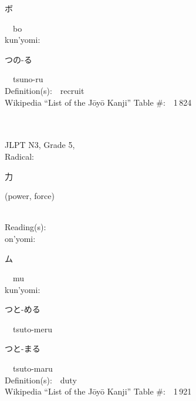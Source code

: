 \begin{multicols}{2}
{\hspace*{2em}}{\begin{CJK}{UTF8}{min} ボ \end{CJK}}\ \ bo\ \ \\
{\hspace*{1em}}kun'yomi:\ \ \\
{\hspace*{2em}}{\begin{CJK}{UTF8}{min} つの-る \end{CJK}}\ \ tsuno-ru\ \ \\
Definition(s):\ \ recruit \\
Wikipedia ``List of the J\=oy\=o Kanji'' Table \#:\ \ 1\,824 \\
\ \ \\
{\fontsize{34pt}{40pt}  }\ \ \\  %
{JLPT N3, Grade 5, \\Radical:\ \ {\begin{CJK}{UTF8}{min} 力 \end{CJK}} (power, force) } \\
Reading(s):\ \ \\
{\hspace*{1em}}on'yomi:\ \ \\
{\hspace*{2em}}{\begin{CJK}{UTF8}{min} ム \end{CJK}}\ \ mu\ \ \\
{\hspace*{1em}}kun'yomi:\ \ \\
{\hspace*{2em}}{\begin{CJK}{UTF8}{min} つと-める \end{CJK}}\ \ tsuto-meru\ \ \\
{\hspace*{2em}}{\begin{CJK}{UTF8}{min} つと-まる \end{CJK}}\ \ tsuto-maru\ \ \\
Definition(s):\ \ duty \\
Wikipedia ``List of the J\=oy\=o Kanji'' Table \#:\ \ 1\,921 \\
\ \ \\
{\fontsize{34pt}{40pt}  }\ \ \\  %

\end{multicols}
